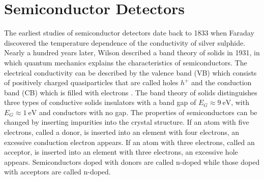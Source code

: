 \chapter{Semiconductor Detectors}\label{Semiconductors}

The earliest studies of semiconductor detectors date back to 1833 when Faraday discovered the temperature dependence of the conductivity of silver sulphide.
Nearly a hundred years later, Wilson described a band theory of solids in 1931, in which quantum mechanics explains the characteristics of semiconductors.
The electrical conductivity can be described by the valence band (VB) which consists of positively charged quasiparticles that are called holes $h^+$ and the conduction band (CB) which is filled with electrons \cite{KolanoskiWermes}.
The band theory of solids distinguishes three types of conductive solids insulators with a band gap of $E_G\approx \SI{9}{\eV}$, with $E_G\approx \SI{1}{\eV}$ and conductors with no gap.
The properties of semiconductors can be changed by inserting impurities into the crystal structure.
If an atom with five electrons, called a donor, is inserted into an element with four electrons, an excessive conduction electron appears.
If an atom with three electrons, called an acceptor, is inserted into an element with three electrons, an excessive hole appears.
Semiconductors doped with donors are called n-doped while those doped with acceptors are called n-doped.
